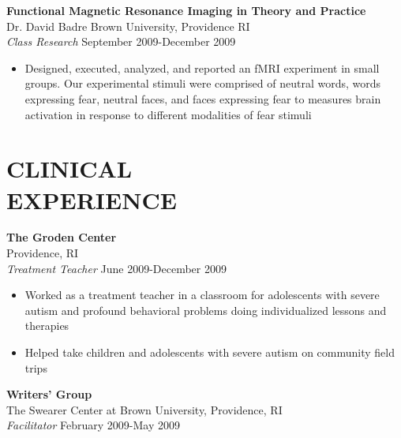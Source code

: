 \documentclass[line,margin,10pt]{res}
\begin{document}
\begin{resume}
\textbf{Functional Magnetic Resonance Imaging in Theory and Practice}\\
Dr. David Badre \hfill Brown University, Providence RI\\
{\sl Class Research} \hfill September 2009-December 2009
\begin{itemize}\itemsep -2pt
\item Designed, executed, analyzed, and reported an fMRI experiment in small groups.  Our experimental stimuli were comprised of neutral words, words expressing fear, neutral faces, and faces expressing fear to measures brain activation in response to different modalities of fear stimuli
\end{itemize}

\section{CLINICAL \\ EXPERIENCE} \textbf{The Groden Center}\\
Providence, RI\\
{\sl Treatment Teacher} \hfill June 2009-December 2009 
               
                 \begin{itemize}  \itemsep -2pt %
                 \item Worked as a treatment teacher in a classroom for adolescents with severe autism and profound behavioral problems doing individualized lessons and therapies
                \item   Helped take children and adolescents with severe autism on community field trips                 \end{itemize}
 \textbf{Writers' Group}\\
   The Swearer Center at Brown University, Providence, RI\\
                {\sl Facilitator} \hfill            February 2009-May 2009 
              

\end{resume}
\end{document}

